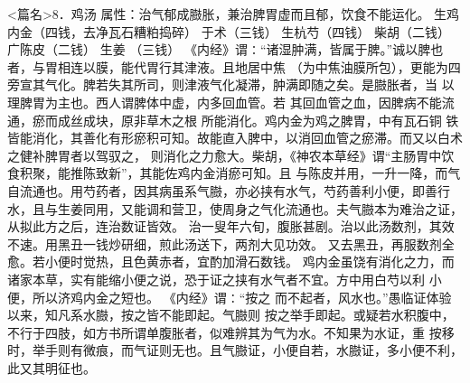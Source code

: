 \documentclass[a4paper,12pt,UTF8,twoside]{ctexbook}
\begin{document}
<篇名>8．鸡汤
属性：治气郁成臌胀，兼治脾胃虚而且郁，饮食不能运化。 
生鸡内金（四钱，去净瓦石糟粕捣碎） 于术（三钱） 生杭芍（四钱） 柴胡（二钱） 广陈皮（二钱） 生姜 
（三钱） 
《内经》谓∶“诸湿肿满，皆属于脾。”诚以脾也者，与胃相连以膜，能代胃行其津液。且地居中焦 
（为中焦油膜所包），更能为四旁宣其气化。脾若失其所司，则津液气化凝滞，肿满即随之矣。是臌胀者，当 
以理脾胃为主也。西人谓脾体中虚，内多回血管。若 
其回血管之血，因脾病不能流通，瘀而成丝成块，原非草木之根 所能消化。鸡内金为鸡之脾胃，中有瓦石铜 
铁皆能消化，其善化有形瘀积可知。故能直入脾中，以消回血管之瘀滞。而又以白术之健补脾胃者以驾驭之， 
则消化之力愈大。柴胡，《神农本草经》谓“主肠胃中饮食积聚，能推陈致新”，其能佐鸡内金消瘀可知。且 
与陈皮并用，一升一降，而气自流通也。用芍药者，因其病虽系气臌，亦必挟有水气，芍药善利小便，即善行 
水，且与生姜同用，又能调和营卫，使周身之气化流通也。夫气臌本为难治之证，从拟此方之后，连治数证皆效。 
治一叟年六旬，腹胀甚剧。治以此汤数剂，其效不速。用黑丑一钱炒研细，煎此汤送下，两剂大见功效。 
又去黑丑，再服数剂全愈。若小便时觉热，且色黄赤者，宜酌加滑石数钱。 
鸡内金虽饶有消化之力，而诸家本草，实有能缩小便之说，恐于证之挟有水气者不宜。方中用白芍以利 
小便，所以济鸡内金之短也。 
《内经》谓∶“按之 而不起者，风水也。”愚临证体验以来，知凡系水臌，按之皆不能即起。气臌则 
按之举手即起。或疑若水积腹中，不行于四肢，如方书所谓单腹胀者，似难辨其为气为水。不知果为水证，重 
按移时，举手则有微痕，而气证则无也。且气臌证，小便自若，水臌证，多小便不利，此又其明征也。 
\end{document}
